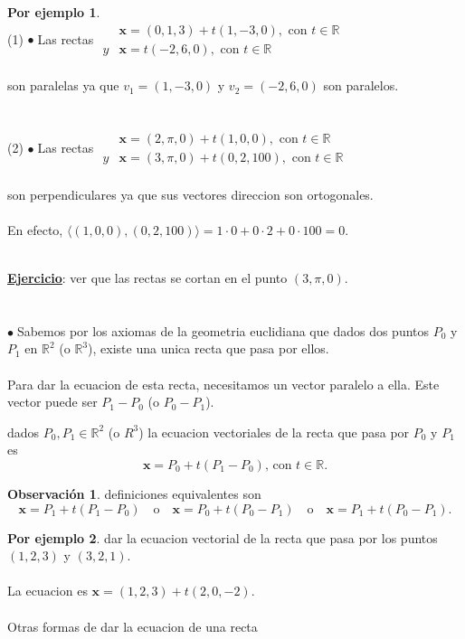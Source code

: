 \documentclass{article}
\theoremstyle{definition}
\newtheorem*{obs}{Observación}
\newtheorem*{ej}{Por ejemplo}
\theoremstyle{remark}
\newcommand\R{\ensuremath{\mathbb{R}}}
\newcommand\bl{$\bullet\;$}
\begin{document}
\begin{ej}
  \; \\
  (1) \quad \bl Las rectas  $\begin{array}{ll}
   &  \mathbf{x}=(0,1,3)+t(1,-3,0), \text{ con } t \in \mathbb{R} \\
    y & \mathbf{x}=t(-2,6,0), \text{ con } t \in \mathbb{R}
  \end{array}$\\\\ son paralelas ya que $v_1= (1,-3,0)$ y $v_2=(-2,6,0)$ son paralelos. \\\\\\
  (2) \quad \bl Las rectas $\begin{array}{ll}
   &  \mathbf{x}=(2,\pi,0)+t(1,0,0), \text{ con } t \in \mathbb{R} \\
    y & \mathbf{x}=(3,\pi,0)+t(0,2,100), \text{ con } t \in \mathbb{R}
  \end{array}$ \\ \\  son perpendiculares ya que sus vectores direccion son ortogonales. \\\\ En efecto, $\langle(1,0,0),(0,2,100) \rangle = 1 \cdot 0 + 0 \cdot 2 + 0 \cdot 100 = 0. $
\end{ej}
\; \\
\underline{\textbf{Ejercicio}}: ver que las rectas se cortan en el punto $(3,\pi,0)$.
\\\\\\
\bl Sabemos por los axiomas de la geometria euclidiana que dados dos puntos $P_0$ y $P_1$ en $\mathbb{R}^2$ (o $\R^3$), existe una unica recta que pasa por ellos. \\\\Para dar la ecuacion de esta recta, necesitamos un vector paralelo a ella. Este vector puede ser $P_1-P_0$ (o $P_0-P_1$). 
\begin{defi}
  dados $P_0,P_1 \in \R^2$ (o $R^3$) la ecuacion vectoriales de la recta que pasa por $P_0$ y $P_1$ es \[
    \mathbf{x}=P_0+t(P_1-P_0) \text{, con } t \in \mathbb{R}.
  \]
\end{defi}
\begin{figure}[h]
\centering
\def\svgwidth{0.55\textwidth}

\end{figure}

\begin{obs}
  definiciones equivalentes son \[
    \mathbf{x} = P_1+t(P_1-P_0) \quad \text{o} \quad \mathbf{x}=P_0+t(P_0-P_1) \quad \text{o} \quad \mathbf{x}=P_1+t(P_0-P_1).
  \]
\end{obs}
\begin{ej}
  dar la ecuacion vectorial de la recta que pasa por los puntos $(1,2,3)$ y $(3,2,1)$. \\ \\ 
  La ecuacion es \quad $\mathbf{x}=(1,2,3)+t(2,0,-2)$. \\\\
  Otras formas de dar la ecuacion de una recta 
\end{ej}
\end{document}
